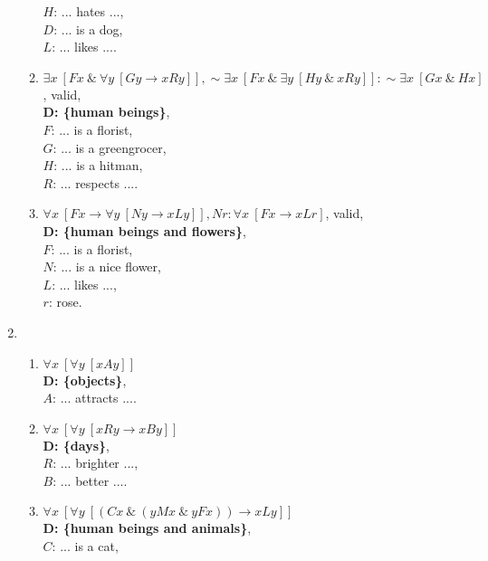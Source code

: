 \documentclass[a4paper,12pt]{article}
\newcommand{\ra}{\rightarrow}
\newcommand{\s}{\sim}
\newcommand{\ta}{ \ \& \ }
\newcommand{\all}{\forall}
\newcommand{\ex}{\exists}
\begin{document}
\begin{enumerate}[label=\arabic*,leftmargin=*]
\begin{enumerate}[label=(\roman*)]
                    $H$: ... hates ...,\\
                    $D$: ... is a dog,\\
                    $L$: ... likes ....
                \item $\ex x \ [Fx \ta \all y \ [Gy \ra xRy]],
                    \s \ex x \ [Fx \ta \ex y \ [Hy \ta xRy]]
                    : \s \ex x \ [Gx \ta Hx]$,
                    valid,\\
                    \textbf{D: \{human beings\}},\\
                    $F$: ... is a florist,\\
                    $G$: ... is a greengrocer,\\
                    $H$: ... is a hitman,\\
                    $R$: ... respects ....
                \item $\all x \ [Fx \ra \all y \ [Ny \ra xLy]],
                    Nr
                    : \all x \ [Fx \ra xLr]$,
                    valid,\\
                    \textbf{D: \{human beings and flowers\}},\\
                    $F$: ... is a florist,\\
                    $N$: ... is a nice flower,\\
                    $L$: ... likes ...,\\
                    $r$: rose.
            \end{enumerate}
        \item
            \begin{enumerate}[label=(\roman*)]
                \item $\all x \ [\all y \ [xAy]]$\\
                    \textbf{D: \{objects\}},\\
                    $A$: ... attracts ....
                \item $\all x \ [\all y \ [xRy \ra xBy]]$\\
                    \textbf{D: \{days\}},\\
                    $R$: ... brighter ...,\\
                    $B$: ... better ....
                \item $\all x \ [\all y \ [(Cx \ta (yMx \ta yFx)) \ra xLy]]$\\
                    \textbf{D: \{human beings and animals\}},\\
                    $C$: ... is a cat,\\

\end{enumerate}
\end{enumerate}
\end{document}
